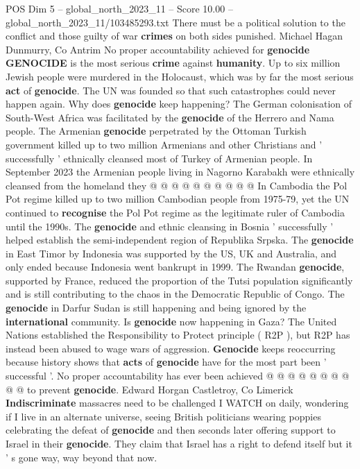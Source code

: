 \begin{textsample}{POS Dim 5 – global\_north\_2023\_11 – Score 10.00 – global\_north\_2023\_11/103485293.txt}
There must be a political solution to the conflict and those guilty of war \textbf{crimes} on both sides punished.
Michael Hagan Dunmurry, Co Antrim No proper accountability achieved for \textbf{genocide} \textbf{GENOCIDE} is the most serious \textbf{crime} against \textbf{humanity}.
Up to six million Jewish people were murdered in the Holocaust, which was by far the most serious \textbf{act} of \textbf{genocide}.
The UN was founded so that such catastrophes could never happen again.
Why does \textbf{genocide} keep happening?
The German colonisation of South-West Africa was facilitated by the \textbf{genocide} of the Herrero and Nama people.
The Armenian \textbf{genocide} perpetrated by the Ottoman Turkish government killed up to two million Armenians and other Christians and ' successfully ' ethnically cleansed most of Turkey of Armenian people.
In September 2023 the Armenian people living in Nagorno Karabakh were ethnically cleansed from the homeland they @ @ @ @ @ @ @ @ @ @ In Cambodia the Pol Pot regime killed up to two million Cambodian people from 1975-79, yet the UN continued to \textbf{recognise} the Pol Pot regime as the legitimate ruler of Cambodia until the 1990s.
The \textbf{genocide} and ethnic cleansing in Bosnia ' successfully ' helped establish the semi-independent region of Republika Srpska.
The \textbf{genocide} in East Timor by Indonesia was supported by the US, UK and Australia, and only ended because Indonesia went bankrupt in 1999.
The Rwandan \textbf{genocide}, supported by France, reduced the proportion of the Tutsi population significantly and is still contributing to the chaos in the Democratic Republic of Congo.
The \textbf{genocide} in Darfur Sudan is still happening and being ignored by the \textbf{international} community.
Is \textbf{genocide} now happening in Gaza?
The United Nations established the Responsibility to Protect principle ( R2P ), but R2P has instead been abused to wage wars of aggression. \textbf{Genocide} keeps reoccurring because history shows that \textbf{acts} of \textbf{genocide} have for the most part been ' successful '.
No proper accountability has ever been achieved @ @ @ @ @ @ @ @ @ @ to prevent \textbf{genocide}.
Edward Horgan Castletroy, Co Limerick \textbf{Indiscriminate} massacres need to be challenged I WATCH on daily, wondering if I live in an alternate universe, seeing British politicians wearing poppies celebrating the defeat of \textbf{genocide} and then seconds later offering support to Israel in their \textbf{genocide}.
They claim that Israel has a right to defend itself but it ' s gone way, way beyond that now.

\end{textsample}
